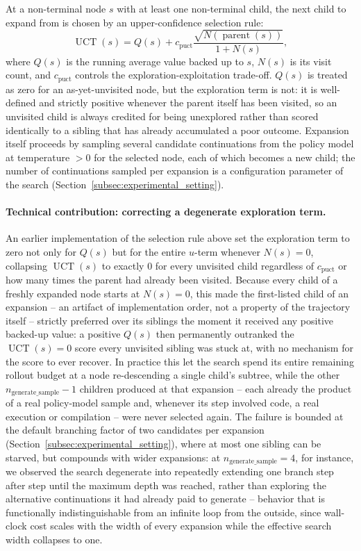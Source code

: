 At a non-terminal node $s$ with at least one non-terminal child, the next
child to expand from is chosen by an upper-confidence selection rule:
\[
    \operatorname{UCT}(s)
    =
    Q(s)
    +
    c_{\text{puct}}
    \frac{\sqrt{N(\operatorname{parent}(s))}}{1 + N(s)},
\]
where $Q(s)$ is the running average value backed up to $s$, $N(s)$ is its
visit count, and $c_{\text{puct}}$ controls the exploration-exploitation
trade-off. $Q(s)$ is treated as zero for an as-yet-unvisited node, but the
exploration term is not: it is well-defined and strictly positive whenever
the parent itself has been visited, so an unvisited child is always credited
for being unexplored rather than scored identically to a sibling that has
already accumulated a poor outcome. Expansion itself proceeds by sampling
several candidate continuations from the policy model at temperature $>0$
for the selected node, each of which becomes a new child; the number of
continuations sampled per expansion is a configuration parameter of the
search (Section~\ref{subsec:experimental_setting}).

\paragraph{Technical contribution: correcting a degenerate exploration term.}
An earlier implementation of the selection rule above set the exploration
term to zero not only for $Q(s)$ but for the entire $u$-term whenever
$N(s)=0$, collapsing $\operatorname{UCT}(s)$ to exactly $0$ for every
unvisited child regardless of $c_{\text{puct}}$ or how many times the parent
had already been visited. Because every child of a freshly expanded node
starts at $N(s)=0$, this made the first-listed child of an expansion -- an
artifact of implementation order, not a property of the trajectory itself --
strictly preferred over its siblings the moment it received any positive
backed-up value: a positive $Q(s)$ then permanently outranked the
$\operatorname{UCT}(s)=0$ score every unvisited sibling was stuck at, with no
mechanism for the score to ever recover. In practice this let the search
spend its entire remaining rollout budget at a node re-descending a single
child's subtree, while the other $n_{\text{generate\_sample}}-1$ children
produced at that expansion -- each already the product of a real
policy-model sample and, whenever its step involved code, a real execution
or compilation -- were never selected again. The failure is bounded at the
default branching factor of two candidates per expansion
(Section~\ref{subsec:experimental_setting}), where at most one sibling can be
starved, but compounds with wider expansions: at
$n_{\text{generate\_sample}}=4$, for instance, we observed the search
degenerate into repeatedly extending one branch step after step until the
maximum depth was reached, rather than exploring the alternative
continuations it had already paid to generate -- behavior that is
functionally indistinguishable from an infinite loop from the outside, since
wall-clock cost scales with the width of every expansion while the effective
search width collapses to one.

